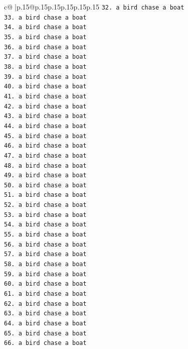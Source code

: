 \documentclass{article}
\begin{document}
{\begin{supertabular}{c@{$\;$}|p{.15\linewidth}@{}p{.15\linewidth}p{.15\linewidth}p{.15\linewidth}p{.15\linewidth}p{.15\linewidth}}
{{{\texttt{32. a bird chase a boat} \\
\texttt{33. a bird chase a boat} \\
\texttt{34. a bird chase a boat} \\
\texttt{35. a bird chase a boat} \\
\texttt{36. a bird chase a boat} \\
\texttt{37. a bird chase a boat} \\
\texttt{38. a bird chase a boat} \\
\texttt{39. a bird chase a boat} \\
\texttt{40. a bird chase a boat} \\
\texttt{41. a bird chase a boat} \\
\texttt{42. a bird chase a boat} \\
\texttt{43. a bird chase a boat} \\
\texttt{44. a bird chase a boat} \\
\texttt{45. a bird chase a boat} \\
\texttt{46. a bird chase a boat} \\
\texttt{47. a bird chase a boat} \\
\texttt{48. a bird chase a boat} \\
\texttt{49. a bird chase a boat} \\
\texttt{50. a bird chase a boat} \\
\texttt{51. a bird chase a boat} \\
\texttt{52. a bird chase a boat} \\
\texttt{53. a bird chase a boat} \\
\texttt{54. a bird chase a boat} \\
\texttt{55. a bird chase a boat} \\
\texttt{56. a bird chase a boat} \\
\texttt{57. a bird chase a boat} \\
\texttt{58. a bird chase a boat} \\
\texttt{59. a bird chase a boat} \\
\texttt{60. a bird chase a boat} \\
\texttt{61. a bird chase a boat} \\
\texttt{62. a bird chase a boat} \\
\texttt{63. a bird chase a boat} \\
\texttt{64. a bird chase a boat} \\
\texttt{65. a bird chase a boat} \\
\texttt{66. a bird chase a boat} \\
}}}
\end{supertabular}}
\end{document}

